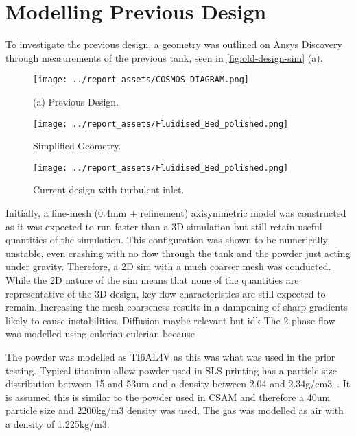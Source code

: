 \section{Modelling Previous Design}
To investigate the previous design, a geometry was outlined on Ansys Discovery through measurements of the previous tank, seen in \autoref{fig:old-design-sim} (a).
\begin{figure}[htbp]
    \centering

    \begin{minipage}{0.3\textwidth}
        \centering
        \texttt{[image: ../report\_assets/COSMOS\_DIAGRAM.png]}
        \caption*{(a) Previous Design.}
    \end{minipage}
    \hfill
    \begin{minipage}{0.3\textwidth}
        \centering
        \texttt{[image: ../report\_assets/Fluidised\_Bed\_polished.png]}
        \caption*{Simplified Geometry.}\label{fig:idkyet9}
    \end{minipage}
    \hfill
    \begin{minipage}{0.3\textwidth}
        \centering
        \texttt{[image: ../report\_assets/Fluidised\_Bed\_polished.png]}
        \caption*{Current design with turbulent inlet.}\label{fig:idkyet10}
    \end{minipage}

\end{figure}\label{fig:old-design-sim}
Initially, a fine-mesh (0.4mm + refinement) axisymmetric model was constructed as it was expected to run faster than a 3D simulation but still retain useful quantities of the simulation. This configuration was shown to be numerically unstable, even crashing with no flow through the tank and the powder just acting under gravity. Therefore, a 2D sim with a much coarser mesh was conducted. While the 2D nature of the sim means that none of the quantities are representative of the 3D design, key flow characteristics are still expected to remain. Increasing the mesh coarseness results in a dampening of sharp gradients likely to cause instabilities. Diffusion maybe relevant but idk
The 2-phase flow was modelled using eulerian-eulerian because 

The powder was modelled as TI6AL4V as this was what was used in the prior testing. Typical titanium allow powder used in SLS printing has a particle size distribution between 15 and 53um and a density between 2.04 and 2.34g/cm3~\cite{ma17040952}. It is assumed this is similar to the powder used in CSAM and therefore a 40um particle size and 2200kg/m3 density was used. The gas was modelled as air with a density of 1.225kg/m3.

